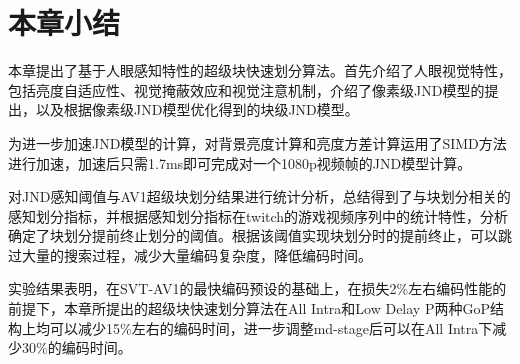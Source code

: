   \section{本章小结}

  本章提出了基于人眼感知特性的超级块快速划分算法。首先介绍了人眼视觉特性，包括亮度自适应性、视觉掩蔽效应和视觉注意机制，介绍了像素级JND模型的提出，以及根据像素级JND模型优化得到的块级JND模型。

  为进一步加速JND模型的计算，对背景亮度计算和亮度方差计算运用了SIMD方法进行加速，加速后只需1.7ms即可完成对一个1080p视频帧的JND模型计算。

  对JND感知阈值与AV1超级块划分结果进行统计分析，总结得到了与块划分相关的感知划分指标，并根据感知划分指标在twitch的游戏视频序列中的统计特性，分析确定了块划分提前终止划分的阈值。根据该阈值实现块划分时的提前终止，可以跳过大量的搜索过程，减少大量编码复杂度，降低编码时间。

  实验结果表明，在SVT-AV1的最快编码预设的基础上，在损失2\%左右编码性能的前提下，本章所提出的超级块快速划分算法在All Intra和Low Delay P两种GoP结构上均可以减少15\%左右的编码时间，进一步调整md-stage后可以在All Intra下减少30\%的编码时间。
